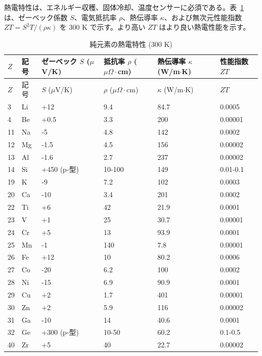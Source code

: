 \documentclass[11pt,a4paper]{article}
\theoremstyle{remark}
\begin{document}
	熱電特性は、エネルギー収穫、固体冷却、温度センサーに必須である。表~\ref{tab:thermoelectric-properties-func} は、ゼーベック係数 \(S\)、電気抵抗率 \(\rho\)、熱伝導率 \(\kappa\)、および無次元性能指数 \(ZT = S^2 T / (\rho \kappa)\) を 300 K で示す。より高い \(ZT\) はより良い熱電性能を示す。
	
	\begin{longtable}{p{0.8cm}p{1.2cm}p{2.2cm}p{2.2cm}p{2.2cm}p{2.2cm}}
		\caption{純元素の熱電特性 (300 K)} \label{tab:thermoelectric-properties-func} \\
		\toprule
		\(Z\) & 記号 & ゼーベック \(S\) (\(\mu\)V/K) & 抵抗率 \(\rho\) (\(\mu\Omega\cdot\)cm) & 熱伝導率 \(\kappa\) (W/m\(\cdot\)K) & 性能指数 \(ZT\) \\
		\midrule
		\endfirsthead
		\toprule
		\(Z\) & 記号 & \(S\) (\(\mu\)V/K) & \(\rho\) (\(\mu\Omega\cdot\)cm) & \(\kappa\) (W/m\(\cdot\)K) & \(ZT\) \\
		\midrule
		\endhead
		3  & Li & +12 & 9.4 & 84.7 & 0.0005 \\
		4  & Be & +0.5 & 3.3 & 200 & 0.00001 \\
		11 & Na & -5 & 4.8 & 142 & 0.0002 \\
		12 & Mg & -1.5 & 4.5 & 156 & 0.00002 \\
		13 & Al & -1.6 & 2.7 & 237 & 0.00002 \\
		14 & Si & +450 (p-型) & 10-100 & 149 & 0.01-0.1 \\
		19 & K  & -9 & 7.2 & 102 & 0.0003 \\
		20 & Ca & -10 & 3.4 & 201 & 0.0002 \\
		22 & Ti & +6 & 42 & 21.9 & 0.0001 \\
		23 & V  & +1 & 25 & 30.7 & 0.00001 \\
		24 & Cr & +5 & 13 & 93.9 & 0.0001 \\
		25 & Mn & -1 & 140 & 7.8 & 0.00001 \\
		26 & Fe & +12 & 10 & 80.2 & 0.0006 \\
		27 & Co & -20 & 6.2 & 100 & 0.0002 \\
		28 & Ni & -15 & 6.9 & 90.9 & 0.0001 \\
		29 & Cu & +2 & 1.7 & 401 & 0.00001 \\
		30 & Zn & +2 & 5.9 & 116 & 0.00002 \\
		31 & Ga & -10 & 14 & 40.6 & 0.0001 \\
		32 & Ge & +300 (p-型) & 10-50 & 60.2 & 0.1-0.5 \\
		40 & Zr & +5 & 40 & 22.7 & 0.00002 \\

\end{longtable}
\end{document}
